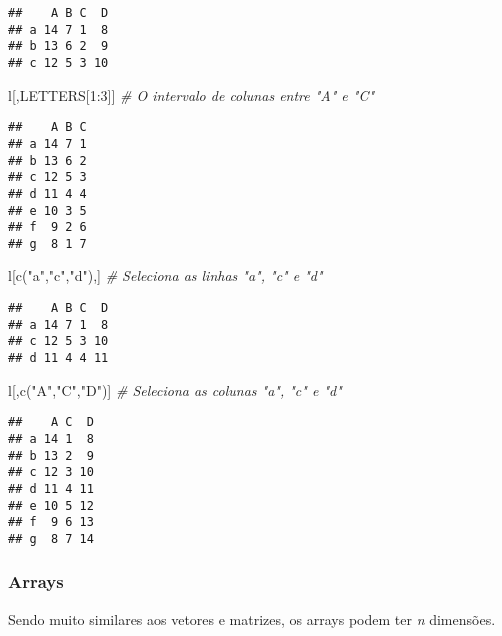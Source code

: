 \documentclass[
]{book}
\newenvironment{Shaded}{\begin{snugshade}}{\end{snugshade}}
\newcommand{\CommentTok}[1]{\textcolor[rgb]{0.56,0.35,0.01}{\textit{#1}}}
\newcommand{\DecValTok}[1]{\textcolor[rgb]{0.00,0.00,0.81}{#1}}
\newcommand{\FunctionTok}[1]{\textcolor[rgb]{0.00,0.00,0.00}{#1}}
\newcommand{\NormalTok}[1]{#1}
\newcommand{\SpecialCharTok}[1]{\textcolor[rgb]{0.00,0.00,0.00}{#1}}
\newcommand{\StringTok}[1]{\textcolor[rgb]{0.31,0.60,0.02}{#1}}
\begin{document}
\begin{verbatim}
##    A B C  D
## a 14 7 1  8
## b 13 6 2  9
## c 12 5 3 10
\end{verbatim}

\begin{Shaded}
\begin{Highlighting}[]
\NormalTok{l[,LETTERS[}\DecValTok{1}\SpecialCharTok{:}\DecValTok{3}\NormalTok{]] }\CommentTok{\# O intervalo de colunas entre "A" e "C"}
\end{Highlighting}
\end{Shaded}

\begin{verbatim}
##    A B C
## a 14 7 1
## b 13 6 2
## c 12 5 3
## d 11 4 4
## e 10 3 5
## f  9 2 6
## g  8 1 7
\end{verbatim}

\begin{Shaded}
\begin{Highlighting}[]
\NormalTok{l[}\FunctionTok{c}\NormalTok{(}\StringTok{"a"}\NormalTok{,}\StringTok{"c"}\NormalTok{,}\StringTok{"d"}\NormalTok{),] }\CommentTok{\# Seleciona as linhas "a", "c" e "d"}
\end{Highlighting}
\end{Shaded}

\begin{verbatim}
##    A B C  D
## a 14 7 1  8
## c 12 5 3 10
## d 11 4 4 11
\end{verbatim}

\begin{Shaded}
\begin{Highlighting}[]
\NormalTok{l[,}\FunctionTok{c}\NormalTok{(}\StringTok{"A"}\NormalTok{,}\StringTok{"C"}\NormalTok{,}\StringTok{"D"}\NormalTok{)] }\CommentTok{\# Seleciona as colunas "a", "c" e "d"}
\end{Highlighting}
\end{Shaded}

\begin{verbatim}
##    A C  D
## a 14 1  8
## b 13 2  9
## c 12 3 10
## d 11 4 11
## e 10 5 12
## f  9 6 13
## g  8 7 14
\end{verbatim}

\hypertarget{arrays}{%
\subsubsection{Arrays}\label{arrays}}

Sendo muito similares aos vetores e matrizes, os arrays podem ter \emph{n} dimensões.
\end{document}
